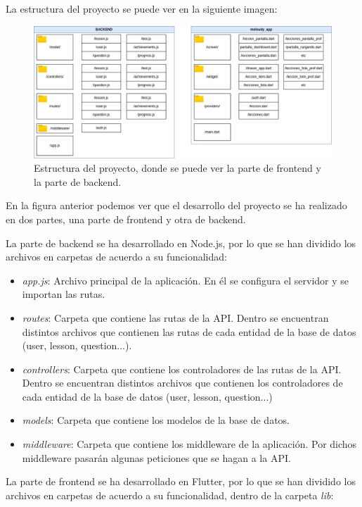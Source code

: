 La estructura del proyecto se puede ver en la siguiente imagen:
\begin{figure}[H]
  \centering
  \includegraphics[width=\textwidth]{imagenes/c7/estructura.png}
  \caption{Estructura del proyecto, donde se puede ver la parte de frontend y la parte de backend.}
  \label{fig:login}
\end{figure}

En la figura anterior podemos ver que el desarrollo del proyecto se ha realizado en dos partes, una parte de frontend y otra de backend.

La parte de backend se ha desarrollado en Node.js, por lo que se han dividido los archivos en carpetas de acuerdo a su funcionalidad:
\begin{itemize}
    \item \textit{app.js}: Archivo principal de la aplicación. En él se configura el servidor y se importan las rutas.
    \item \textit{routes}: Carpeta que contiene las rutas de la API. Dentro se encuentran distintos archivos que contienen las rutas de cada entidad de la base de datos (user, lesson, question...).
    \item \textit{controllers}: Carpeta que contiene los controladores de las rutas de la API. Dentro se encuentran distintos archivos que contienen los controladores de cada entidad de la base de datos (user, lesson, question...)
    \item \textit{models}: Carpeta que contiene los modelos de la base de datos.
    \item \textit{middleware}: Carpeta que contiene los middleware de la aplicación. Por dichos middleware pasarán algunas peticiones que se hagan a la API.
\end{itemize}

La parte de frontend se ha desarrollado en Flutter, por lo que se han dividido los archivos en carpetas de acuerdo a su funcionalidad, dentro de la carpeta \textit{lib}:

